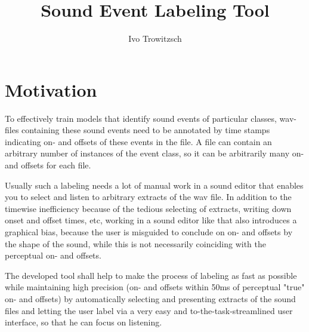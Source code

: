 \documentclass[%
paper=a4,
]
{scrartcl}
\title{Sound Event Labeling Tool}
\author{Ivo Trowitzsch}
\begin{document}
\pagestyle{empty} 



\maketitle 				

\section{Motivation}
To effectively train models that identify sound events of particular classes, wav-files containing these sound events need to be annotated by time stamps indicating on- and offsets of these events in the file. A file can contain an arbitrary number of instances of the event class, so it can be arbitrarily many on- and offsets for each file.

Usually such a labeling needs a lot of manual work in a sound editor that enables you to select and listen to arbitrary extracts of the wav file. In addition to the timewise inefficiency because of the tedious selecting of extracts, writing down onset and offset times, etc, working in a sound editor like that also introduces a graphical bias, because the user is misguided to conclude on on- and offsets by the shape of the sound, while this is not necessarily coinciding with the perceptual on- and offsets.

The developed tool shall help to make the process of labeling as fast as possible while maintaining high precision (on- and offsets within 50ms of perceptual "true" on- and offsets) by automatically selecting and presenting extracts of the sound files and letting the user label via a very easy and to-the-task-streamlined user interface, so that he can focus on listening. 
\end{document}
